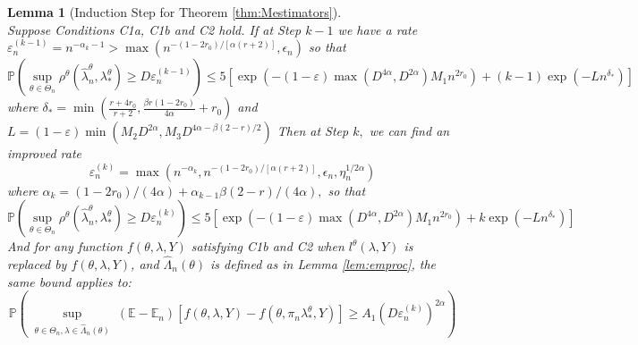 \documentclass[12pt]{article}
\theoremstyle{myplain}
\newtheorem{lemma}{Lemma}[section]
\theoremstyle{definition}
\theoremstyle{definition}
\theoremstyle{remark}
\numberwithin{equation}{section}
\begin{document}
\begin{lemma}[Induction Step for Theorem \ref{thm:Mestimators}]\label{lem:shenstep}\ \\
Suppose Conditions C1a, C1b and C2 hold. If at Step $k-1$ we have a rate
$\varepsilon_{n}^{(k-1)}=n^{-\alpha_{k}-1}>\max \left(n^{-\left(1-2 r_0\right) /[\alpha(r+2)]}, \epsilon_n\right)$ so that
\begin{equation*}
\mathbb{P}\left(\sup_{\theta\in\Theta_n}\rho^\theta\left(\widehat{\lambda}_{n}^\theta, \lambda_*^\theta\right) \geq D \varepsilon_{n}^{(k-1)}\right) \leq 5\left[\exp \left(-(1-\varepsilon) \max \left(D^{4 \alpha}, D^{2 \alpha}\right) M_{1} n^{2 r_0}\right)+(k-1) \exp \left(-L n^{\delta_*}\right)\right]
\end{equation*}
where $\delta_*=\min \left(\frac{r+4 r_0}{r+2}, \frac{\beta r\left(1-2 r_0\right)}{4 \alpha}+r_0\right)$ and $L=(1-\varepsilon) \min \left(M_{2} D^{2 \alpha}, M_{3} D^{4 \alpha-\beta(2-r) / 2}\right)$ Then at Step $k,$ we can find an improved rate
\begin{equation*}
\varepsilon_{n}^{(k)}=\max \left(n^{-\alpha_{k}}, n^{-\left(1-2 r_0\right) /[\alpha(r+2)]}, \epsilon_n, \eta_n^{1/2\alpha}\right)
\end{equation*}
where $\alpha_{k}=\left(1-2 r_0\right) /(4 \alpha)+\alpha_{k-1} \beta(2-r) /(4 \alpha),$ so that
\begin{equation*}
\mathbb{P}\left(\sup_{\theta\in\Theta_n}\rho^\theta\left(\widehat{\lambda}_{n}^\theta, \lambda_*^\theta\right) \geq D \varepsilon_{n}^{(k)}\right) \leq 5\left[\exp \left(-(1-\varepsilon) \max \left(D^{4 \alpha}, D^{2 \alpha}\right) M_{1} n^{2 r_0}\right)+k \exp \left(-L {n}^{\delta_*}\right)\right]
\end{equation*}
And for any function $f(\theta, \lambda, Y)$ satisfying C1b and C2 when $l^\theta(\lambda, Y)$ is replaced by $f(\theta, \lambda, Y)$, and $\widehat{\Lambda}_n(\theta)$ is defined as in Lemma \ref{lem:emproc}, the same bound applies to: $$\mathbb{P}\left(\sup_{\substack{\theta\in\Theta_n , \lambda\in\widehat{\Lambda}_n(\theta)}} (\mathbb{E}-\mathbb{E}_n) [f(\theta, \lambda, Y)-f(\theta, \pi_n\lambda_*^\theta, Y)] \geq A_{1} \left(D \varepsilon_{n}^{(k)}\right)^{2 \alpha}\right)$$
\end{lemma}
\end{document}
